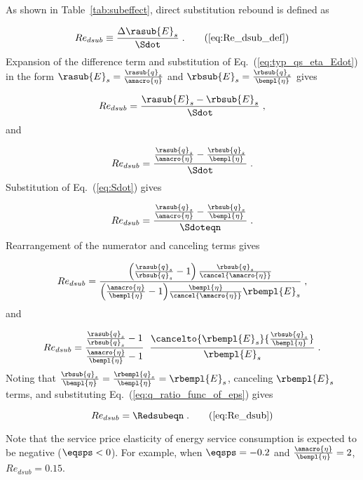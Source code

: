 As shown in Table~\ref{tab:subeffect}, direct substitution rebound is defined as

\begin{equation}
  Re_{dsub} \equiv \frac{\Delta \rasub{E}_s}{\Sdot} \; . \tag{\ref{eq:Re_dsub_def}}
\end{equation}
%
Expansion of the difference term and
substitution of Eq.~(\ref{eq:typ_qs_eta_Edot}) in the form
$\rasub{E}_s = \frac{\rasub{q}_s}{\amacro{\eta}}$
and
$\rbsub{E}_s = \frac{\rbsub{q}_s}{\bempl{\eta}}$
gives

\begin{equation}
   Re_{dsub} = \frac{\rasub{E}_s - \rbsub{E}_s}{\Sdot} \; ,
\end{equation}
%
and

\begin{equation}
     Re_{dsub} = \frac{\frac{\rasub{q}_s}{\amacro{\eta}} - \frac{\rbsub{q}_s}{\bempl{\eta}}}{\Sdot} \; .
\end{equation}
%
Substitution of Eq.~(\ref{eq:Sdot}) gives

\begin{equation}
  Re_{dsub} = \frac{\frac{\rasub{q}_s}{\amacro{\eta}} - \frac{\rbsub{q}_s}{\bempl{\eta}}}
              {\Sdoteqn} \; .
\end{equation}
%
Rearrangement of the numerator and canceling terms gives

\begin{equation}
  Re_{dsub} = \frac{\left( \frac{\rasub{q}_s}{\rbsub{q}_s} - 1 \right) \frac{\rbsub{q}_s}{\cancel{\amacro{\eta}}} }
              {\left( \frac{\amacro{\eta}}{\bempl{\eta}} - 1 \right)\!\frac{\bempl{\eta}}{\cancel{\amacro{\eta}}} \rbempl{E}_s} \; ,
\end{equation}
%
and

\begin{equation}
    Re_{dsub} = \frac{\frac{\rasub{q}_s}{\rbsub{q}_s} - 1}{\frac{\amacro{\eta}}{\bempl{\eta}} - 1} \; \;
                \frac{\cancelto{\rbempl{E}_s}{\frac{\rbsub{q}_s}{\bempl{\eta}}}}{\rbempl{E}_s} \; .
\end{equation}
%
Noting that $\frac{\rbsub{q}_s}{\bempl{\eta}} = \frac{\rbempl{q}_s}{\bempl{\eta}} = \rbempl{E}_s$,
canceling $\rbempl{E}_s$ terms,
and substituting Eq.~(\ref{eq:q_ratio_func_of_eps}) gives

\begin{equation}
  Re_{dsub} = \Redsubeqn \; . \tag{\ref{eq:Re_dsub}}
\end{equation}

Note that the service price elasticity of energy service consumption is
expected to be negative ($\eqsps < 0$).
For example, when $\eqsps = -0.2$ and $\frac{\amacro{\eta}}{\bempl{\eta}} = 2$,
$Re_{dsub} = 0.15$.

